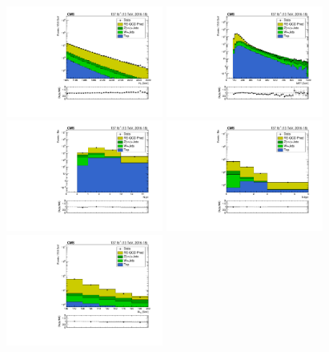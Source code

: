
\begin{figure}[!htbp]
  \begin{center}
    \includegraphics[width=0.46\textwidth]{figs/qcd/rs_data/c_crRSMT2SideBandInclusiveHT1200toInf_h_ht.pdf}
    \includegraphics[width=0.46\textwidth]{figs/qcd/rs_data/c_crRSMT2SideBandInclusiveHT1200toInf_h_met.pdf}
    \includegraphics[width=0.46\textwidth]{figs/qcd/rs_data/c_crRSMT2SideBandInclusiveHT1200toInf_h_nJet30.pdf}
    \includegraphics[width=0.46\textwidth]{figs/qcd/rs_data/c_crRSMT2SideBandInclusiveHT1200toInf_h_nBJet20.pdf}
    \includegraphics[width=0.46\textwidth]{figs/qcd/rs_data/c_crRSMT2SideBandInclusiveHT1200toInf_h_mt2.pdf}

\end{center}
\end{figure}
